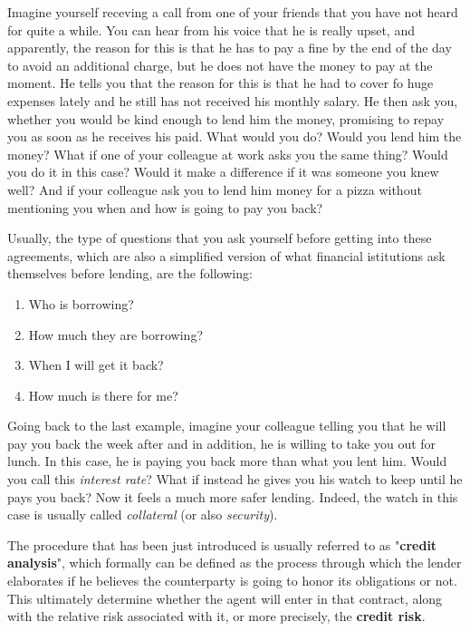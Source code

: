 \documentclass[a4paper,12pt]{article}
\begin{document}
        Imagine yourself receving a call from one of your friends that you have not heard for quite a while. 
        You can hear from his voice that he is really upset, and apparently, the reason for this is that he has to pay a fine 
        by the end of the day to avoid an additional charge, but he does not have the money to pay at the moment. 
        He tells you that the reason for this is that he had to cover fo huge expenses lately and he still has not received his monthly salary. 
        He then ask you, whether you would be kind enough to lend him the money, promising to repay you as soon as he receives his paid.
        What would you do? Would you lend him the money? What if one of your colleague at work asks you the same thing? Would you do it in this case? 
        Would it make a difference if it was someone you knew well? And if your colleague ask you to lend him money for a pizza without mentioning you when and 
        how is going to pay you back? 
    
        Usually, the type of questions that you ask yourself before getting into these agreements, which are also a simplified
        version of what financial istitutions ask themselves before lending, are the following: 

        \begin{enumerate}
            \item Who is borrowing?
            \item How much they are borrowing?
            \item When I will get it back?
            \item How much is there for me?
        \end{enumerate}

        Going back to the last example, imagine your colleague telling you that he will pay you back the week after and in addition, he is willing
        to take you out for lunch. In this case, he is paying you back more than what you lent him. Would you call this \textit{interest rate}? 
        What if instead he gives you his watch to keep until he pays you back? Now it feels a much more safer lending. Indeed, the watch
        in this case is usually called \textit{collateral} (or also \textit{security}).

        The procedure that has been just introduced is usually referred to as "\textbf{credit analysis}", which formally can be defined as the process through
        which the lender elaborates if he believes the counterparty is going to honor its obligations or not. This ultimately determine whether
        the agent will enter in that contract, along with the relative risk associated with it, or more precisely, the \textbf{credit risk}.
\end{document}
